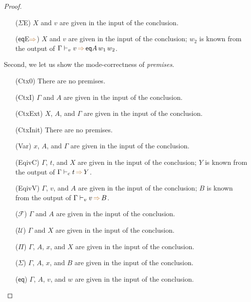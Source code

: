 \documentclass[a4,natbib=false]{article}
\newcommand{\ctov}{\mathcal{U}}
\newcommand{\vtoc}{\mathcal{F}}
\newcommand{\eqtype}[3]{\mathsf{eq}{#1}\,{#2}\,{#3}}
\newcommand{\infers}{{\color{brown} \Rightarrow}}
\newcommand{\judgecInfer}[3]{{#1} \vdash_{c} {#2} \, \infers \, {#3}}
\newcommand{\judgevInfer}[3]{{#1} \vdash_{v} {#2} \, \infers \, {#3}}
\begin{document}
\begin{proof}
\begin{itemize}
  \item[($\Sigma$E)]
    $X$ and $v$ are given in the input of the conclusion.

  \item[($\mathsf{eq}$E$\infers$)]
    $X$ and $v$ are given in the input of the conclusion;
    $w_2$ is known from the output of $\judgevInfer{\Gamma}{v}{\eqtype{A}{w_1}{w_2}}$.
  \end{itemize}

  Second, we let us show the mode-correctness of \emph{premises}.
  
  \newcommand{\fromconcl}{given in the input of the conclusion}

  \begin{multicols}{2}
  \begin{itemize}
      \item[(Ctx0)]
        There are no premises.

      \item[(CtxI)]
        $\Gamma$ and $A$ are \fromconcl.

      \item[(CtxExt)]
        $X$, $A$, and $\Gamma$ are \fromconcl.

      \item[(CtxInit)]
        There are no premises. 

      \item[(Var)]
        $x$, $A$, and $\Gamma$ are \fromconcl.

      \item[(EqivC)]
        $\Gamma$, $t$, and $X$ are \fromconcl;
        $Y$ is known from the output of $\judgecInfer{\Gamma}{t}{Y}$.

      \item[(EqivV)]
        $\Gamma$, $v$, and $A$ are \fromconcl;
        $B$ is known from the output of $\judgevInfer{\Gamma}{v}{B}$.

      \item[($\vtoc$)]
        $\Gamma$ and $A$ are \fromconcl.

      \item[($\ctov$)]
        $\Gamma$ and $X$ are \fromconcl.

      \item[($\Pi$)]
        $\Gamma$, $A$, $x$, and $X$ are \fromconcl.

      \item[($\Sigma$)]
        $\Gamma$, $A$, $x$, and $B$ are \fromconcl.

      \item[($\mathsf{eq}$)]
        $\Gamma$, $A$, $v$, and $w$ are \fromconcl.


\end{itemize}
\end{multicols}
\end{proof}
\end{document}
